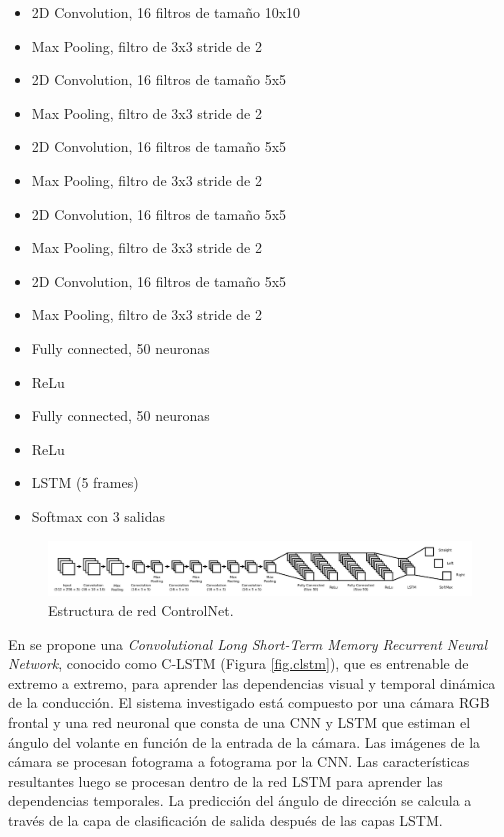 \begin{itemize}
    \item 2D Convolution, 16 filtros de tamaño 10x10
    \item Max Pooling, filtro de 3x3 stride de 2
    \item 2D Convolution, 16 filtros de tamaño 5x5
    \item Max Pooling, filtro de 3x3 stride de 2
    \item 2D Convolution, 16 filtros de tamaño 5x5
    \item Max Pooling, filtro de 3x3 stride de 2
    \item 2D Convolution, 16 filtros de tamaño 5x5
    \item Max Pooling, filtro de 3x3 stride de 2
    \item 2D Convolution, 16 filtros de tamaño 5x5
    \item Max Pooling, filtro de 3x3 stride de 2
    \item Fully connected, 50 neuronas
    \item ReLu
    \item Fully connected, 50 neuronas
    \item ReLu
    \item LSTM (5 frames)
    \item Softmax con 3 salidas
\end{itemize}

\begin{figure}
\begin{center}
	\includegraphics[width=1\textwidth]{img/controlnet.png}
   \caption{Estructura de red ControlNet.}
	\label{fig.controlnet}
\end{center}
\end{figure}

En \cite{temporal-dependencies} se propone una \textit{Convolutional Long Short-Term Memory Recurrent Neural Network}, conocido como C-LSTM (Figura \ref{fig.clstm}), que es entrenable de extremo a extremo, para aprender las dependencias visual y temporal dinámica de la conducción. El sistema investigado está compuesto por una cámara RGB frontal y una red neuronal que consta de una CNN y LSTM que estiman el ángulo del volante en función de la entrada de la cámara. Las imágenes de la cámara se procesan fotograma a fotograma por la CNN. Las características resultantes luego se procesan dentro de la red LSTM para aprender las dependencias temporales. La predicción del ángulo de dirección se calcula a través de la capa de clasificación de salida después de las capas LSTM.

